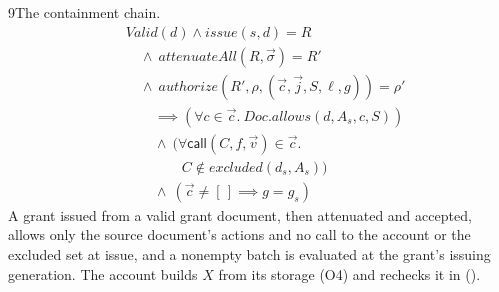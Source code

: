 \begin{perchstatement}{9}{The containment chain.}\label{stmt:the-containment-chain}
\[\begin{aligned}&\mathit{Valid}(d) \land \mathit{issue}(s, d) = R\\
&\quad \land\ \mathit{attenuateAll}(R, \vec\sigma) = R'\\
&\quad \land\ \mathit{authorize}(R', \rho, (\vec c, \vec j, S, \ell, g)) = \rho'\\
&\qquad \implies (\forall c \in \vec c.\ \mathit{Doc.allows}(d, A_s, c, S))\\
&\qquad \land\ (\forall \mathsf{call}(C, f, \vec v) \in \vec c.\\
&\qquad\qquad C \notin \mathit{excluded}(d_s, A_s))\\
&\qquad \land\ (\vec c \neq [\,] \implies g = g_s)\end{aligned}\]
A grant issued from a valid grant document, then attenuated and accepted, allows only the source document's actions and no call to the account or the excluded set at issue, and a nonempty batch is evaluated at the grant's issuing generation. The account builds $X$ from its storage (O4) and rechecks it in  ().
\end{perchstatement}
